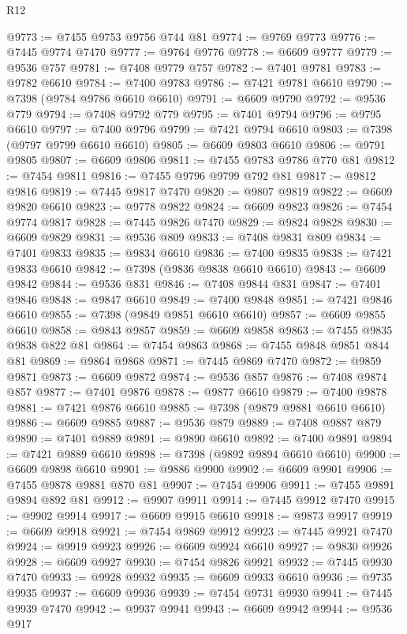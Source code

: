 \begin{lexlean}{R12}
\begin{coremodule}
{{{{{{{{{{{{{{{{{{{{{{{{{{{{{{{{{{{{{{{{{{{{{{{{{{{{{{{{{{{{{{{{{{{{{{{{{{{{{{{{{{@9773 := @7455 @9753 @9756 @744 @81
@9774 := @9769 @9773
@9776 := @7445 @9774 @7470
@9777 := @9764 @9776
@9778 := @6609 @9777
@9779 := @9536 @757
@9781 := @7408 @9779 @757
@9782 := @7401 @9781
@9783 := @9782 @6610
@9784 := @7400 @9783
@9786 := @7421 @9781 @6610
@9790 := @7398 (@9784 @9786 @6610 @6610)
@9791 := @6609 @9790
@9792 := @9536 @779
@9794 := @7408 @9792 @779
@9795 := @7401 @9794
@9796 := @9795 @6610
@9797 := @7400 @9796
@9799 := @7421 @9794 @6610
@9803 := @7398 (@9797 @9799 @6610 @6610)
@9805 := @6609 @9803 @6610
@9806 := @9791 @9805
@9807 := @6609 @9806
@9811 := @7455 @9783 @9786 @770 @81
@9812 := @7454 @9811
@9816 := @7455 @9796 @9799 @792 @81
@9817 := @9812 @9816
@9819 := @7445 @9817 @7470
@9820 := @9807 @9819
@9822 := @6609 @9820 @6610
@9823 := @9778 @9822
@9824 := @6609 @9823
@9826 := @7454 @9774 @9817
@9828 := @7445 @9826 @7470
@9829 := @9824 @9828
@9830 := @6609 @9829
@9831 := @9536 @809
@9833 := @7408 @9831 @809
@9834 := @7401 @9833
@9835 := @9834 @6610
@9836 := @7400 @9835
@9838 := @7421 @9833 @6610
@9842 := @7398 (@9836 @9838 @6610 @6610)
@9843 := @6609 @9842
@9844 := @9536 @831
@9846 := @7408 @9844 @831
@9847 := @7401 @9846
@9848 := @9847 @6610
@9849 := @7400 @9848
@9851 := @7421 @9846 @6610
@9855 := @7398 (@9849 @9851 @6610 @6610)
@9857 := @6609 @9855 @6610
@9858 := @9843 @9857
@9859 := @6609 @9858
@9863 := @7455 @9835 @9838 @822 @81
@9864 := @7454 @9863
@9868 := @7455 @9848 @9851 @844 @81
@9869 := @9864 @9868
@9871 := @7445 @9869 @7470
@9872 := @9859 @9871
@9873 := @6609 @9872
@9874 := @9536 @857
@9876 := @7408 @9874 @857
@9877 := @7401 @9876
@9878 := @9877 @6610
@9879 := @7400 @9878
@9881 := @7421 @9876 @6610
@9885 := @7398 (@9879 @9881 @6610 @6610)
@9886 := @6609 @9885
@9887 := @9536 @879
@9889 := @7408 @9887 @879
@9890 := @7401 @9889
@9891 := @9890 @6610
@9892 := @7400 @9891
@9894 := @7421 @9889 @6610
@9898 := @7398 (@9892 @9894 @6610 @6610)
@9900 := @6609 @9898 @6610
@9901 := @9886 @9900
@9902 := @6609 @9901
@9906 := @7455 @9878 @9881 @870 @81
@9907 := @7454 @9906
@9911 := @7455 @9891 @9894 @892 @81
@9912 := @9907 @9911
@9914 := @7445 @9912 @7470
@9915 := @9902 @9914
@9917 := @6609 @9915 @6610
@9918 := @9873 @9917
@9919 := @6609 @9918
@9921 := @7454 @9869 @9912
@9923 := @7445 @9921 @7470
@9924 := @9919 @9923
@9926 := @6609 @9924 @6610
@9927 := @9830 @9926
@9928 := @6609 @9927
@9930 := @7454 @9826 @9921
@9932 := @7445 @9930 @7470
@9933 := @9928 @9932
@9935 := @6609 @9933 @6610
@9936 := @9735 @9935
@9937 := @6609 @9936
@9939 := @7454 @9731 @9930
@9941 := @7445 @9939 @7470
@9942 := @9937 @9941
@9943 := @6609 @9942
@9944 := @9536 @917
}}}}}}}}}}}}}}}}}}}}}}}}}}}}}}}}}}}}}}}}}}}}}}}}}}}}}}}}}}}}}}}}}}}}}}}}}}}}}}}}}}
\end{coremodule}
\end{lexlean}

